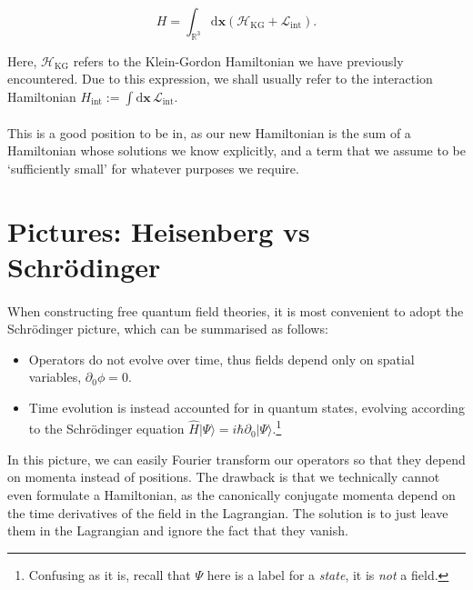 \documentclass[12pt]{report}
\begin{document}
	\begin{equation}
		H = \int_{\mathbb{R}^3} \mathrm{d}\mathbf{x} \left( \mathcal{H}_\text{KG} + \mathcal{L}_\text{int} \right).
	\end{equation}
	
Here, $\mathcal{H}_\text{KG}$ refers to the Klein-Gordon Hamiltonian we have previously encountered. Due to this expression, we shall usually refer to the interaction Hamiltonian ${H_\text{int} := \int \mathrm{d}\mathbf{x} \, \mathcal{L}_\text{int}}$.

\paragraph{}This is a good position to be in, as our new Hamiltonian is the sum of a Hamiltonian whose solutions we know explicitly, and a term that we assume to be `sufficiently small' for whatever purposes we require.

\section{Pictures: Heisenberg vs Schr\"odinger}

\paragraph{}When constructing free quantum field theories, it is most convenient to adopt the Schr\"odinger picture, which can be summarised as follows:

	\begin{itemize}
		\item Operators do not evolve over time, thus fields depend only on spatial variables, $\partial_0 \phi = 0$.
		\item Time evolution is instead accounted for in quantum states, evolving according to the Schr\"odinger equation $\hat{H} |\Psi \rangle = i\hbar \partial_0 |\Psi \rangle$.\footnote{Confusing as it is, recall that $\Psi$ here is a label for a \textit{state}, it is \textit{not} a field.}
	\end{itemize}
	
In this picture, we can easily Fourier transform our operators so that they depend on momenta instead of positions. The drawback is that we technically cannot even formulate a Hamiltonian, as the canonically conjugate momenta depend on the time derivatives of the field in the Lagrangian. The solution is to just leave them in the Lagrangian and ignore the fact that they vanish.
\end{document}
